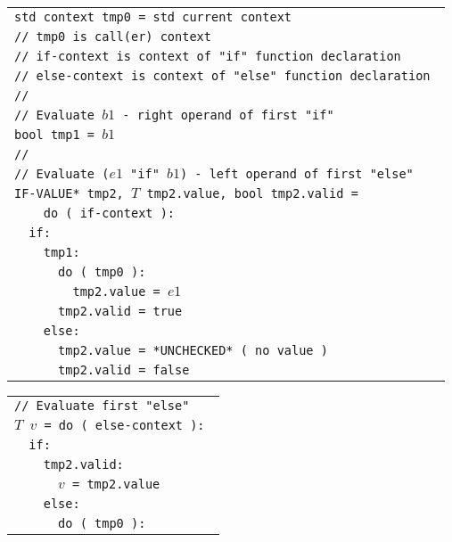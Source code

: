 \documentclass[12pt]{article}
\newenvironment{indpar}[1][0.3in]%
	{\begin{list}{}%
		     {\setlength{\itemsep}{0in}%
		      \setlength{\topsep}{0in}%
		      \setlength{\parsep}{1ex}%
		      \setlength{\labelwidth}{#1}%
		      \setlength{\leftmargin}{#1}%
		      \addtolength{\leftmargin}{\labelsep}}%
	 \item}%
	{\end{list}}
\begin{document}
\begin{indpar}
\begin{tabular}{l}
\tt std context tmp0 = std current context \\
\tt // tmp0 is call(er) context \\
\tt // if-context is context of "if" function declaration \\
\tt // else-context is context of "else" function declaration \\
\tt // \\
\tt // Evaluate $b1$ - right operand of first "if"\\
\tt bool tmp1 = $b1$ \\
\tt // \\
\tt // Evaluate ($e1$ "if" $b1$) - left operand of first "else" \\
\tt *IF-VALUE* tmp2, $T$ tmp2.value, bool tmp2.valid = \\
\tt ~~~~do ( if-context ): \\
\tt ~~if: \\
\tt ~~~~tmp1: \\
\tt ~~~~~~do ( tmp0 ): \\
\tt ~~~~~~~~tmp2.value = $e1$ \\
\tt ~~~~~~tmp2.valid = true \\
\tt ~~~~else: \\
\tt ~~~~~~tmp2.value = *UNCHECKED* ( no value ) \\
\tt ~~~~~~tmp2.valid = false \\
\end{tabular}

\begin{tabular}{l}
\tt // Evaluate first "else" \\
\tt $T$ $v$ = do ( else-context ): \\
\tt ~~if: \\
\tt ~~~~tmp2.valid: \\
\tt ~~~~~~$v$ = tmp2.value \\
\tt ~~~~else: \\
\tt ~~~~~~do ( tmp0 ): \\
\end{tabular}


\end{indpar}
\end{document}
